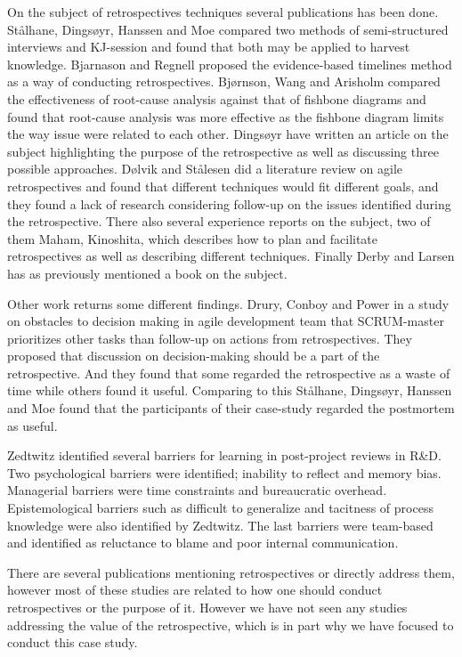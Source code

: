On the subject of retrospectives techniques several publications has been done. Stålhane, Dingsøyr, Hanssen and Moe\cite{Hanssen2003} compared two methods of semi-structured interviews and KJ-session and found that both may be applied to harvest knowledge. Bjarnason and Regnell\cite{Bjarnason2012} proposed the evidence-based timelines method as a way of conducting retrospectives. Bjørnson, Wang and Arisholm\cite{bjornson2009} compared the effectiveness of root-cause analysis against that of fishbone diagrams and found that root-cause analysis was more effective as the fishbone diagram limits the way issue were related to each other. Dingsøyr\cite{Dingsoyr2004} have written an article on the subject highlighting the purpose of the retrospective as well as discussing three possible approaches. Dølvik and Stålesen\cite{Dolvik2014} did a literature review on agile retrospectives and found that different techniques would fit different goals, and they found a lack of research considering follow-up on the issues identified during the retrospective. There also several experience reports on the subject, two of them Maham\cite{Maham2008}, Kinoshita\cite{Kinoshita2008}, which describes how to plan and facilitate retrospectives as well as describing different techniques. Finally Derby and Larsen\cite{Larsen2006} has as previously mentioned a book on the subject. 

Other work returns some different findings. Drury, Conboy and Power\cite{Drury2012} in a study on obstacles to decision making in agile development team that SCRUM-master prioritizes other tasks than follow-up on actions from retrospectives. They proposed that discussion on decision-making should be a part of the retrospective. And they found that some regarded the retrospective as a waste of time while others found it useful. Comparing to this Stålhane, Dingsøyr, Hanssen and Moe\cite{Hanssen2003} found that the participants of their case-study regarded the postmortem as useful. 

Zedtwitz\cite{Zedtwitz2002} identified several barriers for learning in post-project reviews in R\&D. Two psychological barriers were identified; inability to reflect and memory bias. Managerial barriers were time constraints and bureaucratic overhead. Epistemological barriers such as difficult to generalize and tacitness of process knowledge were also identified by Zedtwitz. The last barriers were team-based and identified as reluctance to blame and poor internal communication. 

There are several publications mentioning retrospectives or directly address them, however most of these studies are related to how one should conduct retrospectives or the purpose of it. However we have not seen any studies addressing the value of the retrospective, which is in part why we have focused to conduct this case study. 
\clearpage

